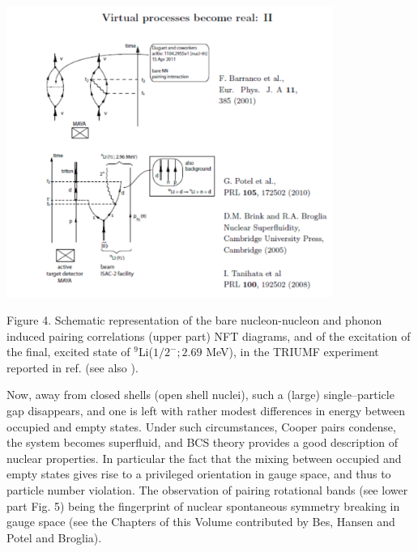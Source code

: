 \documentclass[a4paper,14pt]{book}
\begin{document}
\vspace{0.3cm}

\includegraphics[width=0.8\textwidth]{figs_C4S/fig_virtual} \hspace{0.1cm} 
\begin{footnotesize}
	\begin{center}
		Figure 4. Schematic representation of the bare nucleon-nucleon and phonon induced pairing correlations (upper part) NFT diagrams, and of the excitation of the final, excited state of $^{9}$Li($1/2^{-}; 2.69$ MeV), in the TRIUMF experiment  reported in ref. \cite{Tanihata:08} (see also \cite{Potel:10}).
	\end{center}
\end{footnotesize}



Now, away from closed shells (open shell nuclei), such a (large) single--particle gap disappears, and one is left with rather modest differences in energy between occupied and empty states. Under such circumstances, Cooper pairs condense, the system becomes superfluid, and BCS theory provides a good description of nuclear properties. In particular the fact that the mixing between occupied and empty states gives rise to a privileged orientation in gauge space, and thus to particle number violation. The observation of pairing rotational bands (see lower part Fig. 5) being the fingerprint of nuclear spontaneous symmetry breaking in gauge space (see the Chapters of this Volume contributed by Bes, Hansen and Potel and Broglia).
\end{document}
